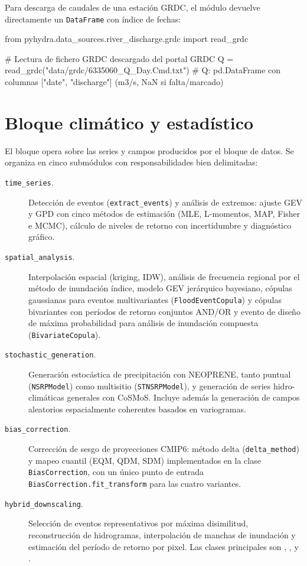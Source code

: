 Para descarga de caudales de una estación GRDC, el módulo devuelve directamente un \texttt{DataFrame} con índice de fechas:

\begin{codeblock}
from pyhydra.data_sources.river_discharge.grdc import read_grdc

# Lectura de fichero GRDC descargado del portal GRDC
Q = read_grdc("data/grdc/6335060_Q_Day.Cmd.txt")
# Q: pd.DataFrame con columnas ["date", "discharge"] (m3/s, NaN si falta/marcado)
\end{codeblock}

\section{Bloque climático y estadístico}

El bloque  opera sobre las series y campos producidos por el bloque de datos. Se organiza en cinco submódulos con responsabilidades bien delimitadas:

\begin{description}
  \item[\texttt{time\_series}.] Detección de eventos (\texttt{extract\_events}) y análisis de extremos: ajuste GEV y GPD con cinco métodos de estimación (MLE, L-momentos, MAP, Fisher e MCMC), cálculo de niveles de retorno con incertidumbre y diagnóstico gráfico.

  \item[\texttt{spatial\_analysis}.] Interpolación espacial (kriging, IDW), análisis de frecuencia regional por el método de inundación índice, modelo GEV jerárquico bayesiano, cópulas gaussianas para eventos multivariantes (\texttt{FloodEventCopula}) y cópulas bivariantes con períodos de retorno conjuntos AND/OR y evento de diseño de máxima probabilidad para análisis de inundación compuesta (\texttt{BivariateCopula}).

  \item[\texttt{stochastic\_generation}.] Generación estocástica de precipitación con NEOPRENE, tanto puntual (\texttt{NSRPModel}) como multisitio (\texttt{STNSRPModel}), y generación de series hidro-climáticas generales con CoSMoS. Incluye además la generación de campos aleatorios espacialmente coherentes basados en variogramas.

  \item[\texttt{bias\_correction}.] Corrección de sesgo de proyecciones CMIP6: método delta (\texttt{delta\_method}) y mapeo cuantil (EQM, QDM, SDM) implementados en la clase \texttt{BiasCorrection}, con un único punto de entrada \texttt{BiasCorrection.fit\_transform} para las cuatro variantes.

  \item[\texttt{hybrid\_downscaling}.] Selección de eventos representativos por máxima disimilitud, reconstrucción de hidrogramas, interpolación de manchas de inundación y estimación del período de retorno por pixel. Las clases principales son , ,  y .
\end{description}

